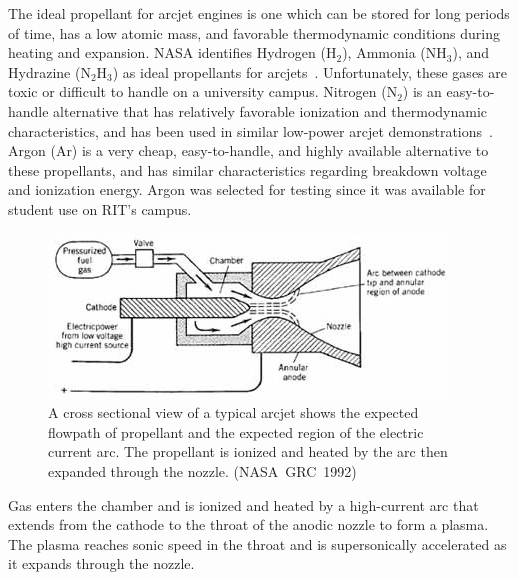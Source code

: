 \documentclass[conference]{IEEEtran}
\begin{document}
The ideal propellant for arcjet engines is one which can be stored for long periods of time, has a low atomic mass, and favorable thermodynamic conditions during heating and expansion.
NASA identifies Hydrogen (H$_{2}$), Ammonia (NH$_{3}$), and Hydrazine (N$_{2}$H$_{3}$) as ideal propellants for arcjets~\cite{nasa1992considerations}.
Unfortunately, these gases are toxic or difficult to handle on a university campus.
Nitrogen (N$_{2}$) is an easy-to-handle alternative that has relatively favorable ionization and thermodynamic characteristics, and has been used in similar low-power arcjet demonstrations~\cite{olin2012report,olin2012sim}.
Argon (Ar) is a very cheap, easy-to-handle, and highly available alternative to these propellants, and has similar characteristics regarding breakdown voltage and ionization energy.
Argon was selected for testing since it was available for student use on RIT's campus.
\begin{figure}[htp]
  \centering
  \includegraphics[width=\linewidth]{figs/cross-section_nasa}
  \caption[Arcjet cross-section]{A cross sectional view of a typical arcjet shows the expected flowpath of propellant and the expected region of the electric current arc. The propellant is ionized and heated by the arc then expanded through the nozzle. (NASA~GRC~1992)
\label{fig:x-section-nasa}
}
\end{figure}

Gas enters the chamber and is ionized and heated by a high-current arc that extends from the cathode to the throat of the anodic nozzle to form a plasma.
The plasma reaches sonic speed in the throat and is supersonically accelerated as it expands through the nozzle.
\end{document}
